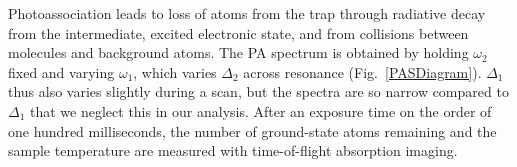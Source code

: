 

Photoassociation leads to loss of atoms from the trap through radiative decay from the intermediate, excited electronic state, and from collisions between molecules and background atoms. The PA spectrum is obtained by holding $\omega_2$ fixed and varying $\omega_1$, which varies $\Delta_2$ across resonance (Fig.\ \ref{PASDiagram}). $\Delta_1$ thus also varies slightly during a scan, but the spectra are so narrow compared to $\Delta_1$ that we neglect this in our analysis. After an exposure time on the order of one hundred milliseconds, the number of ground-state atoms remaining and the sample temperature are measured with time-of-flight absorption imaging.







